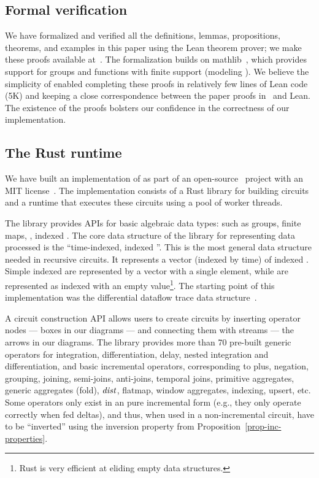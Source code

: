 \subsection{Formal verification}

We have formalized and verified all the definitions, lemmas,
propositions, theorems, and examples in this paper using the Lean
theorem prover; we make these proofs available at~\cite{dbsp-theory}.
The formalization builds on mathlib~\cite{mathlib2020}, which provides
support for groups and functions with finite support (modeling
\zrs). We believe the simplicity of \dbsp enabled completing these
proofs in relatively few lines of Lean code (5K) and keeping a close
correspondence between the paper proofs in~\cite{tr} and Lean.  The
existence of the proofs bolsters our confidence in the correctness of
our implementation.

\subsection{The \dbsp Rust runtime}\label{sec:runtime}

We have built an implementation of \dbsp as part of an
open-source~\cite{dbsp-repo} project with an MIT
license~\cite{dbsp-crate}.  The implementation consists of a Rust
library for building circuits and a runtime that executes these
circuits using a pool of worker threads.

The library provides APIs for basic algebraic data types: such as
groups, finite maps, \zrs, indexed \zrs.  The core data structure of
the library for representing data processed is the ``time-indexed,
indexed \zr''.  This is the most general data structure needed in
recursive circuits.  It represents a vector (indexed by time) of
indexed \zrs.  Simple indexed \zrs are represented by a vector with a
single element, while \zrs are represented as indexed \zrs with an
empty value\footnote{Rust is very efficient at eliding empty data
structures.}.  The starting point of this implementation was the
differential dataflow trace data structure~\cite{dd-crate}.

A circuit construction API allows users to create \dbsp circuits by
inserting operator nodes --- boxes in our diagrams --- and connecting
them with streams --- the arrows in our diagrams.  The library
provides more than 70 pre-built generic operators for integration,
differentiation, delay, nested integration and differentiation, and
basic \zr incremental operators, corresponding to plus, negation,
grouping, joining, semi-joins, anti-joins, temporal joins, primitive
aggregates, generic aggregates (fold), $\mathit{dist}$, flatmap, window
aggregates, indexing, upsert, etc.  Some operators only exist in an
pure incremental form (e.g., they only operate correctly when fed
deltas), and thus, when used in a non-incremental circuit, have to be
``inverted'' using the inversion property from
Proposition~\ref{prop-inc-properties}.

